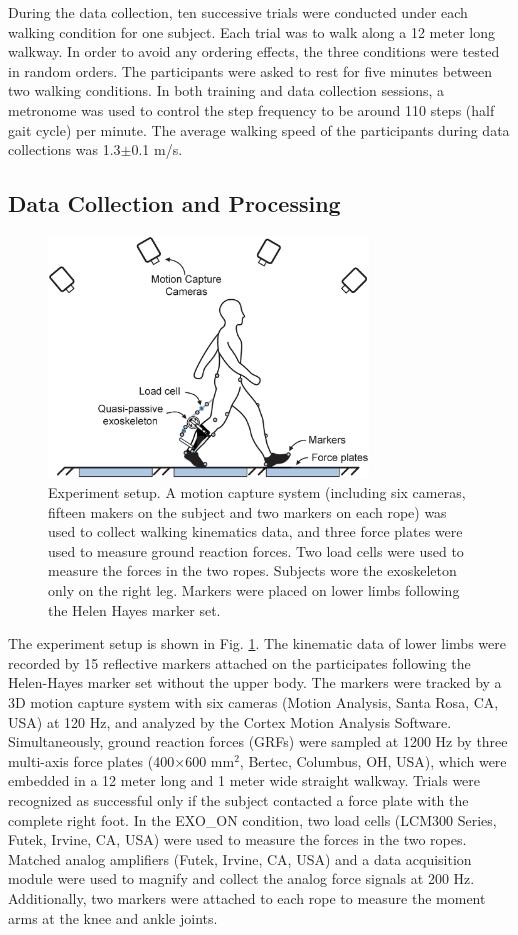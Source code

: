 \documentclass[10pt]{asme2ej}
\begin{document}
During the data collection, ten successive trials were conducted under each walking condition for one subject.
Each trial was to walk along a 12 meter long walkway.
In order to avoid any ordering effects, the three conditions were tested in random orders.
The participants were asked to rest for five minutes between two walking conditions.
In both training and data collection sessions, a metronome was used to control the step frequency to be around 110 steps (half gait cycle) per minute.
The average walking speed of the participants during data collections was 1.3$\pm$0.1 m/s.

\subsection{Data Collection and Processing}

\begin{figure}[bt]
	\centering
	\includegraphics[width=8.5cm]{environment.eps}
	\caption{Experiment setup.
	A motion capture system (including six cameras, fifteen makers on the subject and two markers on each rope) was used to collect walking kinematics data, and three force plates were used to measure ground reaction forces.
	Two load cells were used to measure the forces in the two ropes.
	Subjects wore the exoskeleton only on the right leg.
	Markers were placed on lower limbs following the Helen Hayes marker set.}
	\label{fig:Environment}
\end{figure}

The experiment setup is shown in Fig. \ref{fig:Environment}.
The kinematic data of lower limbs were recorded by 15 reflective markers attached on the participates following the Helen-Hayes marker set \cite{RN24} without the upper body.
The markers were tracked by a 3D motion capture system with six cameras (Motion Analysis, Santa Rosa, CA, USA) at 120 Hz, and analyzed by the Cortex Motion Analysis Software.
Simultaneously, ground reaction forces (GRFs) were sampled at 1200 Hz by three multi-axis force plates (400$\times$600 mm$^{2}$, Bertec, Columbus, OH, USA), which were embedded in a 12 meter long and 1 meter wide straight walkway.
Trials were recognized as successful only if the subject contacted a force plate with the complete right foot.
In the EXO\_ON condition, two load cells (LCM300 Series, Futek, Irvine, CA, USA) were used to measure the forces in the two ropes.
Matched analog amplifiers (Futek, Irvine, CA, USA) and a data acquisition module were used to magnify and collect the analog force signals at 200 Hz.
Additionally, two markers were attached to each rope to measure the moment arms at the knee and ankle joints.
\end{document}
